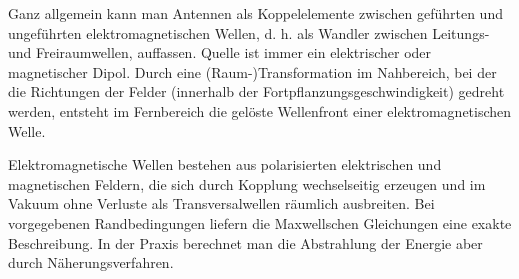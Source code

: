 Ganz allgemein kann man Antennen als Koppelelemente zwischen geführten und ungeführten elektromagnetischen Wellen, d. h. als Wandler zwischen Leitungs- und Freiraumwellen, auffassen. Quelle ist immer ein elektrischer oder magnetischer Dipol. Durch eine (Raum-)Transformation im Nahbereich, bei der die Richtungen der Felder (innerhalb der Fortpflanzungsgeschwindigkeit) gedreht werden, entsteht im Fernbereich die gelöste Wellenfront einer elektromagnetischen Welle. 

Elektromagnetische Wellen bestehen aus polarisierten elektrischen und magnetischen Feldern, die sich durch Kopplung wechselseitig erzeugen und im Vakuum ohne Verluste als Transversalwellen räumlich ausbreiten. Bei vorgegebenen Randbedingungen liefern die Maxwellschen Gleichungen eine exakte Beschreibung. In der Praxis berechnet man die Abstrahlung der Energie aber durch Näherungsverfahren. 




